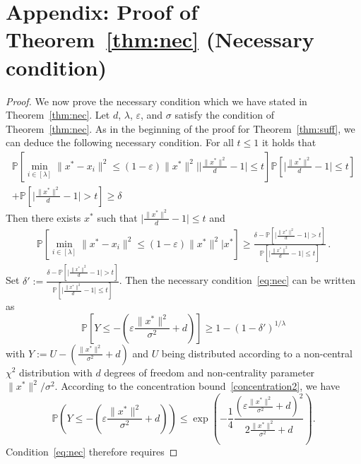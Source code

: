 \section{Appendix: Proof of Theorem~\ref{thm:nec} (Necessary condition)}
\label{sec:nec}
\begin{proof}
We now prove the necessary condition which we have stated in Theorem~\ref{thm:nec}.
Let $d$, $\lambda$, $\varepsilon$, and $\sigma$ satisfy the condition of Theorem~\ref{thm:nec}.  
As in the beginning of the proof for Theorem~\ref{thm:suff}, we can deduce the following necessary condition. For all $t\leq1$ it holds that 
\begin{align*}
    \mathbb{P}\left[\min_{i\in[\lambda]}\lVert x^*-x_i\rVert^2 \leq \left(1-\varepsilon\right)\lVert x^*\rVert^2\big| \lvert\frac{\lVert x^*\rVert^2}{d}-1\rvert\leq t\right]
  \mathbb{P}\left[\lvert\frac{\lVert x^*\rVert^2}{d}-1\rvert\leq t\right]\\
  +\mathbb{P}\left[\lvert\frac{\lVert x^*\rVert^2}{d}-1\rvert> t\right]\geq \delta
\end{align*}
Then there exists $x^*$ such that $\lvert\frac{\lVert x^*\rVert^2}{d}-1\rvert\leq t$ and 
\begin{eqnarray}
\mathbb{P}\left[\min_{i\in[\lambda]}\lVert x^*-x_i\rVert^2 \leq \left(1-\varepsilon\right)\lVert x^*\rVert^2\big| x^*\right]
  \geq\frac{\delta- \mathbb{P}\left[\lvert\frac{\lVert x^*\rVert^2}{d}-1\rvert > t\right]}{ \mathbb{P}\left[\lvert\frac{\lVert x^*\rVert^2}{d}-1\rvert\leq t\right]}\,. 
\label{eq:nec}
\end{eqnarray}
Set $\delta' := \frac{\delta- \mathbb{P}\left[\lvert\frac{\lVert x^*\rVert^2}{d}-1\rvert > t\right]}{ \mathbb{P}\left[\lvert\frac{\lVert x^*\rVert^2}{d}-1\rvert\leq t\right]} $. 
Then the necessary condition~\eqref{eq:nec} can be written as
$$\mathbb{P}\left[Y\leq -\left(\varepsilon\frac{\lVert x^*\rVert^2}{\sigma^2}+d\right)\right]\geq1-(1-\delta')^{1/\lambda}$$
with $Y := U-(\frac{\lVert x^*\rVert^2}{\sigma^2}+d)$ and 
$U$ being distributed according to a non-central $\chi^2$ distribution with $d$ degrees of freedom and non-centrality parameter $\lVert x^*\rVert^2/\sigma^2$.
According to the concentration bound~\eqref{concentration2}, we have 
$$\mathbb{P}\left(Y\leq -\left(\varepsilon\frac{\lVert x^*\rVert^2}{\sigma^2}+d\right)\right) \leq\exp{\left(-\frac14 \frac{(\varepsilon\frac{\lVert x^*\rVert^2}{\sigma^2}+d)^2}{2\frac{\lVert x^*\rVert^2}{\sigma^2}+d}\right)}.$$
%
Condition~\eqref{eq:nec} therefore requires   

\end{proof}
